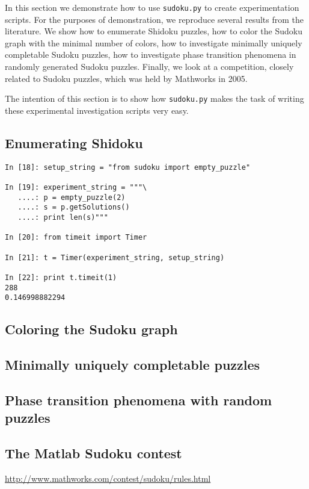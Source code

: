 In this section we demonstrate how to use \texttt{sudoku.py} to create experimentation scripts. For the purposes of demonstration, we reproduce several results from the literature. We show how to enumerate Shidoku puzzles, how to color the Sudoku graph with the minimal number of colors, how to investigate minimally uniquely completable Sudoku puzzles, how to investigate phase transition phenomena in randomly generated Sudoku puzzles. Finally, we look at a competition, closely related to Sudoku puzzles, which was held by Mathworks in 2005. 

The intention of this section is to show how \texttt{sudoku.py} makes the task of writing these experimental investigation scripts very easy.

\subsection{Enumerating Shidoku}
\label{sec:shidoku}

\begin{lstlisting}[caption=Enumerating Shidoku via constraint model]
In [18]: setup_string = "from sudoku import empty_puzzle"

In [19]: experiment_string = """\
   ....: p = empty_puzzle(2)
   ....: s = p.getSolutions()
   ....: print len(s)"""

In [20]: from timeit import Timer

In [21]: t = Timer(experiment_string, setup_string)

In [22]: print t.timeit(1)
288
0.146998882294
\end{lstlisting}

\subsection{Coloring the Sudoku graph}
\label{sec:coloring}

\subsection{Minimally uniquely completable puzzles}
\label{sec:minimal}

\subsection{Phase transition phenomena with random puzzles}
\label{sec:phase}

\cite{lewismetaheur}

\subsection{The Matlab Sudoku contest}
\label{sec:contest}

\url{http://www.mathworks.com/contest/sudoku/rules.html}

